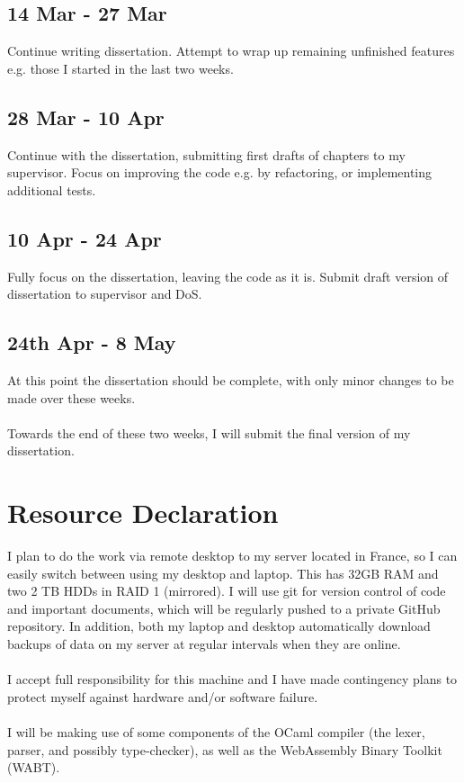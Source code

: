	\subsection*{14 Mar - 27 Mar}
	Continue writing dissertation. Attempt to wrap up remaining unfinished features e.g. those I started in the last two weeks.
	
	\subsection*{28 Mar - 10 Apr}
	Continue with the dissertation, submitting first drafts of chapters to my supervisor. Focus on improving the code e.g. by refactoring, or implementing additional tests.
	
	\subsection*{10 Apr - 24 Apr}
	Fully focus on the dissertation, leaving the code as it is. Submit draft version of dissertation to supervisor and DoS.
	
	\subsection*{24th Apr - 8 May}
	At this point the dissertation should be complete, with only minor changes to be made over these weeks.
	\\\\
	Towards the end of these two weeks, I will submit the final version of my dissertation.
	
	
	\section*{Resource Declaration}
	I plan to do the work via remote desktop to my server located in France, so I can easily switch between using my desktop and laptop. This has 32GB RAM and two 2 TB HDDs in RAID 1 (mirrored). I will use git for version control of code and important documents, which will be regularly pushed to a private GitHub repository. In addition, both my laptop and desktop automatically download backups of data on my server at regular intervals when they are online.
	\\\\
	I accept full responsibility for this machine and I have made contingency plans to protect myself against hardware and/or software failure.
	\\\\
	I will be making use of some components of the OCaml compiler (the lexer, parser, and possibly type-checker), as well as the WebAssembly Binary Toolkit (WABT).